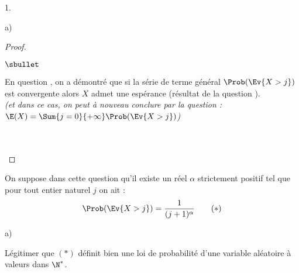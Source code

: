\begin{noliste}{1.}
\begin{noliste}{a)}
\begin{proof}
\begin{noliste}{$\sbullet$}
      \item En question , on a démontré que si la série de
        terme général $\Prob(\Ev{X > j})$ est convergente alors $X$
        admet une espérance (résultat de la question ).\\
        {\it (et dans ce cas, on peut à nouveau conclure par la
          question  : $\E(X) = \Sum{j=0}{+\infty}
          \Prob(\Ev{X > j})$)}
      \end{noliste}~\\[-1.2cm]
      ~\\[-.8cm]
    \end{proof}
  \end{noliste}

\item On suppose dans cette question qu'il existe un réel $\alpha$
  strictement positif tel que pour tout entier naturel $j$ on ait :
  \[
  \Prob(\Ev{X >j})= \dfrac{1}{(j+1)^{\alpha}} \qquad (\ast)
  \]
  \begin{noliste}{a)}
  \item Légitimer que $(\ast)$ définit bien une loi de probabilité d'une 
    variable aléatoire à valeurs dans $\N^*$.
    

\end{noliste}
\end{noliste}
